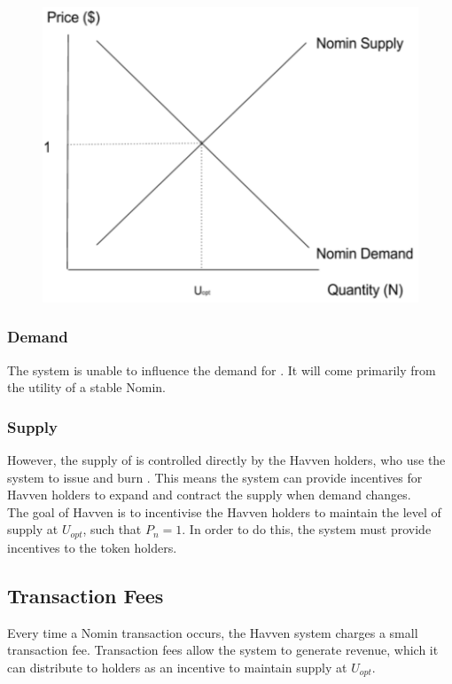 \begin{figure}[h!]
    \centering
    \includegraphics[width=.7\textwidth]{img/nomin-demand-vs-supply}
\end{figure}

\subsubsection*{Demand}

\noindent The system is unable to influence the demand for \NOM{}. It will come primarily from the utility of a stable Nomin.

\subsubsection*{Supply}

\noindent However, the supply of \NOM{} is controlled directly by the Havven holders, who use the system to issue and burn \NOM{}. This means the system can provide incentives for Havven holders to expand and contract the \NOM{} supply when demand changes. \\

\noindent The goal of Havven is to incentivise the Havven holders to maintain the level of \NOM{} supply at $U_{opt}$, such that $P_n = 1$. In order to do this, the system must provide incentives to the \HAV{} token holders.  \\

\newpage

\subsection{Transaction Fees} Every time a Nomin transaction occurs, the Havven system charges a small transaction fee. Transaction fees allow the system to generate revenue, which it can distribute to \HAV{} holders as an incentive to maintain \NOM{} supply at $U_{opt}$. \\

